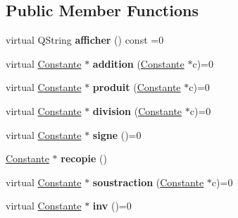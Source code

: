 \subsection*{\-Public \-Member \-Functions}
\begin{DoxyCompactItemize}
\item 
\hypertarget{class_constante_a78b5d9ee6a7e70349db6641a08f77479}{virtual \-Q\-String {\bfseries afficher} () const =0}\label{class_constante_a78b5d9ee6a7e70349db6641a08f77479}

\item 
\hypertarget{class_constante_a580f4535e16d4c9331da85750be6e5ad}{virtual \hyperlink{class_constante}{\-Constante} $\ast$ {\bfseries addition} (\hyperlink{class_constante}{\-Constante} $\ast$c)=0}\label{class_constante_a580f4535e16d4c9331da85750be6e5ad}

\item 
\hypertarget{class_constante_ad805854dd4e53f0ef5b2d482398b682a}{virtual \hyperlink{class_constante}{\-Constante} $\ast$ {\bfseries produit} (\hyperlink{class_constante}{\-Constante} $\ast$c)=0}\label{class_constante_ad805854dd4e53f0ef5b2d482398b682a}

\item 
\hypertarget{class_constante_ab9b969ad6ad0d8463d44a1273667ee79}{virtual \hyperlink{class_constante}{\-Constante} $\ast$ {\bfseries division} (\hyperlink{class_constante}{\-Constante} $\ast$c)=0}\label{class_constante_ab9b969ad6ad0d8463d44a1273667ee79}

\item 
\hypertarget{class_constante_a1c6f79dbc7623529ee4fd5ae9c556b45}{virtual \hyperlink{class_constante}{\-Constante} $\ast$ {\bfseries signe} ()=0}\label{class_constante_a1c6f79dbc7623529ee4fd5ae9c556b45}

\item 
\hypertarget{class_constante_ac6fb071229429f82cf489f8313461efa}{\hyperlink{class_constante}{\-Constante} $\ast$ {\bfseries recopie} ()}\label{class_constante_ac6fb071229429f82cf489f8313461efa}

\item 
\hypertarget{class_constante_ad1df4970f093fdb4235d4945ec2dbf12}{virtual \hyperlink{class_constante}{\-Constante} $\ast$ {\bfseries soustraction} (\hyperlink{class_constante}{\-Constante} $\ast$c)=0}\label{class_constante_ad1df4970f093fdb4235d4945ec2dbf12}

\item 
\hypertarget{class_constante_a63d03e59594b74aa2fbc35f559b0ad46}{virtual \hyperlink{class_constante}{\-Constante} $\ast$ {\bfseries inv} ()=0}\label{class_constante_a63d03e59594b74aa2fbc35f559b0ad46}


\end{DoxyCompactItemize}
